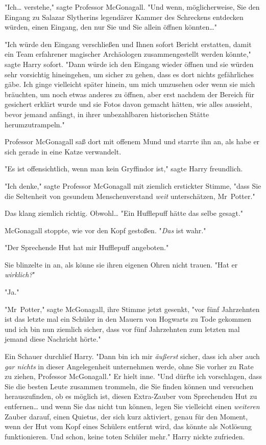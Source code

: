 {"Ich… verstehe," sagte Professor McGonagall. "Und wenn, möglicherweise, Sie den Eingang zu Salazar Slytherins legendärer Kammer des Schreckens entdecken würden, einen Eingang, den nur Sie und Sie allein öffnen könnten…"

"Ich würde den Eingang verschließen und Ihnen sofort Bericht erstatten, damit ein Team erfahrener magischer Archäologen zusammengestellt werden könnte," sagte Harry sofort. "Dann würde ich den Eingang wieder öffnen und sie würden sehr vorsichtig hineingehen, um sicher zu gehen, dass es dort nichts gefährliches gäbe. Ich ginge vielleicht später hinein, um mich umzusehen oder wenn sie mich bräuchten, um noch etwas anderes zu öffnen, aber erst nachdem der Bereich für gesichert erklärt wurde und sie Fotos davon gemacht hätten, wie alles aussieht, bevor jemand anfängt, in ihrer unbezahlbaren historischen Stätte herumzutrampeln."

Professor McGonagall saß dort mit offenem Mund und starrte ihn an, als habe er sich gerade in eine Katze verwandelt.

"Es ist offensichtlich, wenn man kein Gryffindor ist," sagte Harry freundlich.

"Ich denke," sagte Professor McGonagall mit ziemlich erstickter Stimme, "dass Sie die Seltenheit von gesundem Menschenverstand \emph{weit} unterschätzen, Mr~Potter."

Das klang ziemlich richtig. Obwohl… "Ein Hufflepuff hätte das selbe gesagt."

McGonagall stoppte, wie vor den Kopf gestoßen. "\emph{Das} ist wahr."

"Der Sprechende Hut hat mir Hufflepuff angeboten."

Sie blinzelte in an, als könne sie ihren eigenen Ohren nicht trauen. "Hat er \emph{wirklich?}"

"Ja."

"Mr~Potter," sagte McGonagall, ihre Stimme jetzt gesenkt, "vor fünf Jahrzehnten ist das letzte mal ein Schüler in den Mauern von Hogwarts zu Tode gekommen und ich bin nun ziemlich sicher, dass vor fünf Jahrzehnten zum letzten mal jemand diese Nachricht hörte."

Ein Schauer durchlief Harry. "Dann bin ich mir \emph{äußerst} sicher, dass ich aber auch \emph{gar nichts} in dieser Angelegenheit unternehmen werde, ohne Sie vorher zu Rate zu ziehen, Professor McGonagall." Er hielt inne. "Und dürfte ich vorschlagen, dass Sie die besten Leute zusammen trommeln, die Sie finden können und versuchen herauszufinden, ob es möglich ist, diesen Extra-Zauber vom Sprechenden Hut zu entfernen… und wenn Sie das nicht tun können, legen Sie vielleicht einen \emph{weiteren} Zauber darauf, einen Quietus, der sich kurz aktiviert, genau für den Moment, wenn der Hut vom Kopf eines Schülers entfernt wird, das könnte als Notlösung funktionieren. Und schon, keine toten Schüler mehr." Harry nickte zufrieden.

}
